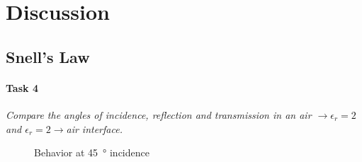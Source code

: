 \section{Discussion}\label{sec:discussion}
\subsection{Snell's Law}
\paragraph{Task 4}\textit{Compare the angles of incidence, reflection and transmission in an air $\rightarrow \epsilon_r = 2$ and $\epsilon_r = 2 \rightarrow $air interface.}
\begin{figure}[htpb]
	\caption{Behavior at \SI{45}{\degree} incidence}
	\label{fig:snell}
\end{figure}


